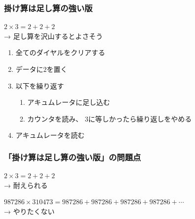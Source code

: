 \documentclass[
  lualatex,
  aspectratio=169,
  fleqn,
  14pt
]{beamer}
\begin{document}
\begin{frame}
  \frametitle{掛け算は足し算の強い版}

  $2\times3=2+2+2$\\
  \hspace{2.5\zw}→ 足し算を沢山するとよさそう

  \begin{enumerate}
    \item
      全てのダイヤルをクリアする
    \item
      データに$2$を置く
    \item
      以下を繰り返す
      \begin{enumerate}
        \item
          アキュムレータに足し込む
        \item
          カウンタを読み、
          $3$に等しかったら繰り返しをやめる
      \end{enumerate}
    \item
      アキュムレータを読む
  \end{enumerate}

\end{frame}

\begin{frame}
  \frametitle{「掛け算は足し算の強い版」の問題点}

  $2\times3 = 2+2+2$\\
  \hspace{2.5\zw}→ 耐えられる

  $987286\times310473 = 987286+987286+987286+987286+\cdots$\\
  \hspace{2.5\zw}→ やりたくない

\end{frame}
\end{document}
